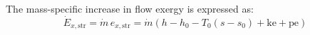 The mass-specific increase in flow exergy is expressed as:  
\[
\dot{E}_{x,\text{str}} = \dot{m} \, e_{x,\text{str}} = \dot{m} \left( h - h_0 - T_0 (s - s_0) + \text{ke} + \text{pe} \right)
\]